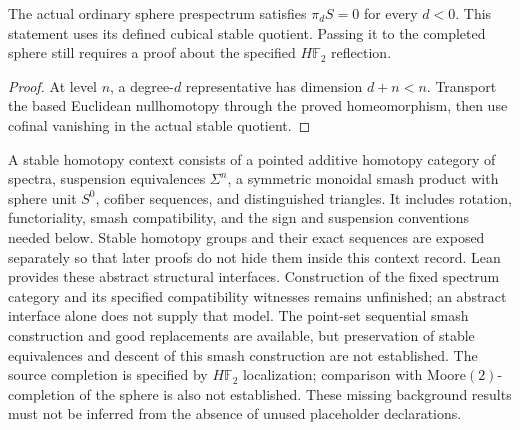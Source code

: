 \begin{proposition}
  \label{prop:ordinary-sphere-connective}
  \leanok
  The actual ordinary sphere prespectrum satisfies $\pi_d S=0$ for
  every $d<0$. This statement uses its defined cubical stable quotient.
  Passing it to the completed sphere still requires a proof about
  the specified $H\mathbb F_2$ reflection.
\end{proposition}
\begin{proof}
  At level $n$, a degree-$d$ representative has dimension $d+n<n$.
  Transport the based Euclidean nullhomotopy through the proved
  homeomorphism, then use cofinal vanishing in the actual stable quotient.
  \leanok
\end{proof}

\begin{definition}
  \label{def:stable-context}
  \notready
  A stable homotopy context consists of a pointed additive homotopy category
  of spectra, suspension equivalences $\Sigma^n$, a symmetric monoidal smash
  product with sphere unit $S^0$, cofiber sequences, and distinguished
  triangles.  It includes rotation, functoriality, smash compatibility, and
  the sign and suspension conventions needed below.  Stable homotopy groups
  and their exact sequences are exposed separately so that later proofs do not
  hide them inside this context record.
  Lean provides these abstract structural interfaces. Construction of the
  fixed spectrum category and its specified compatibility witnesses remains
  unfinished; an abstract interface alone does not supply that model.
  The point-set sequential smash construction and good replacements are
  available, but preservation of stable equivalences and descent of this
  smash construction are not established. The source completion is specified by $H\mathbb F_2$
  localization; comparison with Moore$(2)$-completion of the sphere is also
  not established. These missing background results must not be inferred
  from the absence of unused placeholder declarations.
\end{definition}

